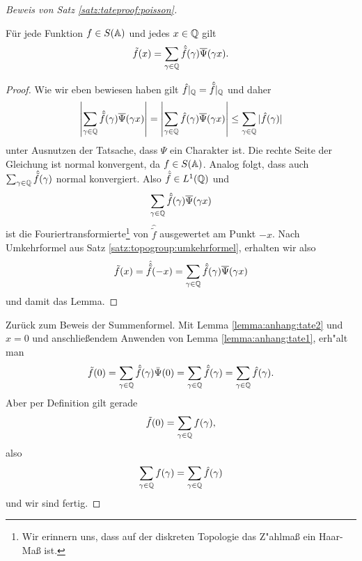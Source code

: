 \begin{proof}[Beweis von Satz \ref{satz:tateproof:poisson}]
		\begin{lemma}\label{lemma:anhang:tate2}
			Für jede Funktion $f \in S(\mathbb{A})$ und jedes $x\in \mathbb{Q}$ gilt
			\begin{align*}
				\tilde{f}(x) = \sum_{\gamma \in \mathbb{Q}} {\hat{\tilde{f}}(\gamma)\overline{\Psi}(\gamma x)}.
			\end{align*}
		\end{lemma}
		\begin{proof}
			Wie wir eben bewiesen haben gilt $\hat{f}|_{\mathbb{Q}} = \hat{\tilde{f}}|_{\mathbb{Q}}$ und daher
			\begin{align*}
				\left| \sum_{\gamma \in \mathbb{Q}} {\hat{\tilde{f}}(\gamma)\overline{\Psi}(\gamma x)}\right| = 
				\left| \sum_{\gamma \in \mathbb{Q}} {\hat{f}(\gamma)\overline{\Psi}(\gamma x)}\right| 
				\leq \sum_{\gamma \in \mathbb{Q}} {|\hat{f}(\gamma)|}
			\end{align*}
			unter Ausnutzen der Tatsache, dass $\Psi$ ein Charakter ist. Die rechte Seite der Gleichung ist normal konvergent, da $f \in S(\mathbb{A})$. 
			Analog folgt, dass auch $\sum_{\gamma \in \mathbb{Q}} {\hat{\tilde{f}}(\gamma)}$ normal konvergiert. 
			Also $\hat{\tilde{f}} \in L^1(\mathbb{Q})$ und
			\begin{align*}
				\sum_{\gamma \in \mathbb{Q}} {\hat{\tilde{f}}(\gamma)\overline{\Psi}(\gamma x)}
			\end{align*}
			ist die Fouriertransformierte\footnote{Wir erinnern uns, dass auf der diskreten Topologie das Z"ahlmaß ein Haar-Maß ist.} von $\hat{\tilde{f}}$ ausgewertet am Punkt $-x$.
			Nach Umkehrformel aus Satz \ref{satz:topogroup:umkehrformel}, erhalten wir also
			\begin{align*}
				\tilde{f}(x) = \hat{\hat{\tilde{f}}}(-x) = \sum_{\gamma \in \mathbb{Q}} {\hat{\tilde{f}}(\gamma)\overline{\Psi}(\gamma x)}
			\end{align*}
			und damit das Lemma.
		\end{proof}
		Zurück zum Beweis der Summenformel. 
		Mit Lemma \ref{lemma:anhang:tate2} und $x=0$ und anschließendem Anwenden von Lemma \ref{lemma:anhang:tate1}, erh"alt man
		\begin{align*}
			\tilde{f}(0) = 	\sum_{\gamma \in \mathbb{Q}} \hat{\tilde{f}}(\gamma) \bar{\Psi}(0) =
							\sum_{\gamma \in \mathbb{Q}} \hat{\tilde{f}}(\gamma) =
							\sum_{\gamma \in \mathbb{Q}} \hat{f}(\gamma).
		\end{align*}
		Aber per Definition gilt gerade
		\begin{align*}
			\tilde{f}(0) = \sum_{\gamma \in \mathbb{Q}}f(\gamma),
		\end{align*}
		also
		\begin{align*}
			\sum_{\gamma \in \mathbb{Q}}f(\gamma) = \sum_{\gamma \in \mathbb{Q}} \hat{f}(\gamma)
		\end{align*}
		und wir sind fertig.
	\end{proof}